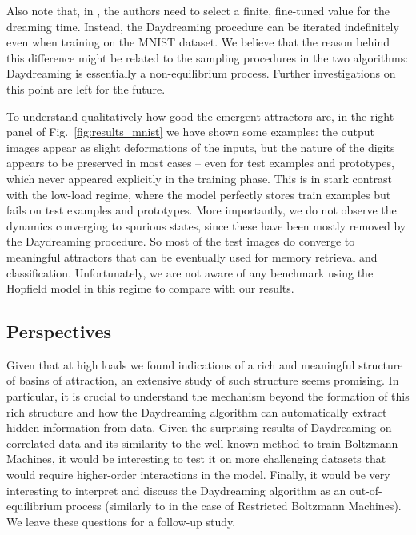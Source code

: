 \documentclass[a4paper]{cas-sc}
\begin{document}
Also note that, in \cite{agliari2023regularization}, the authors need to select a finite, fine-tuned value for the dreaming time. Instead, the Daydreaming procedure can be iterated indefinitely even when training on the MNIST dataset. We believe that the reason behind this difference might be related to the sampling procedures in the two algorithms: Daydreaming is essentially a non-equilibrium process. Further investigations on this point are left for the future.

To understand qualitatively how good the emergent attractors are, in the right panel of Fig.~\ref{fig:results_mnist} we have shown some examples: the output images appear as slight deformations of the inputs, but the nature of the digits appears to be preserved in most cases -- even for test examples and prototypes, which never appeared explicitly in the training phase. This is in stark contrast with the low-load regime, where the model perfectly stores train examples but fails on test examples and prototypes.
More importantly, we do not observe the dynamics converging to spurious states, since these have been mostly removed by the Daydreaming procedure. So most of the test images do converge to meaningful attractors that can be eventually used for memory retrieval and classification.
Unfortunately, we are not aware of any benchmark using the Hopfield model in this regime to compare with our results.

\subsection{Perspectives}
Given that at high loads we found indications of a rich and meaningful structure of basins of attraction, an extensive study of such structure seems promising.
In particular, it is crucial to understand the mechanism beyond the formation of this rich structure and how the Daydreaming algorithm can automatically extract hidden information from data.
Given the surprising results of Daydreaming on correlated data and its similarity to the well-known method to train Boltzmann Machines, it would be interesting to test it on more challenging datasets that would require higher-order interactions in the model.
Finally, it would be  very interesting to interpret and discuss the Daydreaming algorithm as an out-of-equilibrium process (similarly to \cite{decelle2021equilibrium,agoritsas2023explaining} in the case of Restricted Boltzmann Machines).
We leave these questions for a follow-up study.

\end{document}
